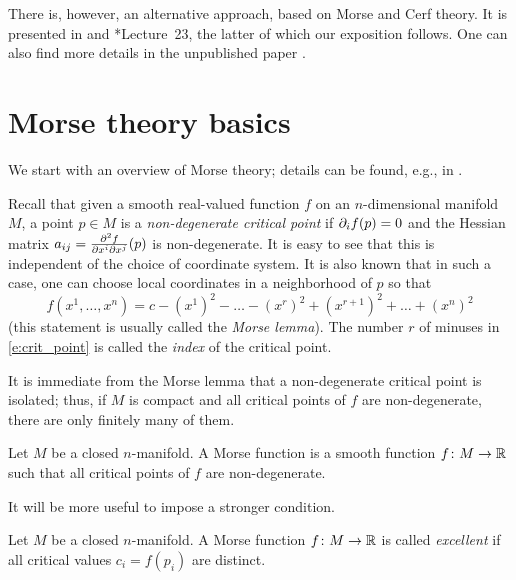 There is, however, an alternative approach, based on Morse and Cerf theory.
It is presented in  and *{Lecture~23},
the latter of which our exposition follows. One can also find more details
in the unpublished paper .

\section{Morse theory basics}\label{s:morse}

We start with an overview of Morse theory; details can be found, e.g., in
.

Recall that given a smooth real-valued function $f$ on an $n$-dimensional
manifold $M$, a point $p\in M$ is a \emph{non-degenerate critical point}
 if
$\partial_i f (p)=0$ and the Hessian matrix
$a_{ij}=\frac{\partial^2 f}{\partial x^i \partial x^j}(p)$ is non-degenerate. It is easy to
see that this is independent of the choice of coordinate system. It is also
known that in such a case, one can choose local coordinates in a neighborhood
of $p$ so that
\begin{equation}\label{e:crit_point}
  f(x^1, \dots, x^n)=c-(x^1)^2 -\dots -(x^r)^2
  + (x^{r+1})^2+ \dots + (x^n)^2
\end{equation}
(this statement is usually called the \emph{Morse lemma}).
The number $r$ of minuses in \eqref{e:crit_point} is called the \emph{index}
of the critical point.

It is immediate from the Morse lemma that a non-degenerate critical point
is isolated; thus, if $M$ is compact and all critical points of $f$ are
non-degenerate, there are only finitely many of them.

\begin{definition}\label{d:morse_function}
  Let $M$ be a closed $n$-manifold. A Morse function is a
  smooth function $f\colon M\to \mathbb{R}$ such that all critical points
  of $f$ are non-degenerate.
\end{definition}

It will be more useful to impose a stronger condition.

\begin{definition}\label{d:morse_function2}
  Let $M$ be a closed $n$-manifold. A Morse function $f\colon M\to \mathbb{R}$
  is called \emph{excellent} if all critical
  values $c_i=f(p_i)$ are distinct.
\end{definition}

